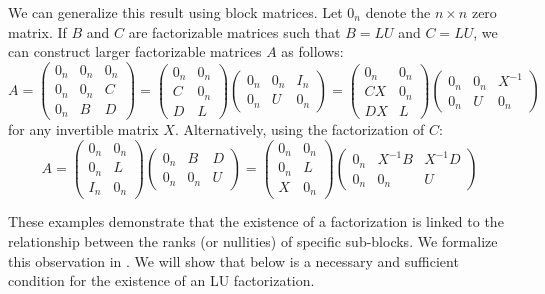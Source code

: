 \documentclass{article}
\begin{document}
We can generalize this result using block matrices. Let $0_n$ denote the $n \times n$ zero matrix. If $B$ and $C$ are factorizable matrices such that $B=LU$ and $C=LU$, we can construct larger factorizable matrices $A$ as follows:
\[
    A = \begin{pmatrix}
        0_n & 0_n & 0_n \\
        0_n & 0_n & C   \\
        0_n & B   & D
    \end{pmatrix}
    =
    \begin{pmatrix}
        0_n & 0_n \\
        C   & 0_n \\
        D   & L
    \end{pmatrix}
    \begin{pmatrix}
        0_n & 0_n & I_n \\
        0_n & U   & 0_n
    \end{pmatrix}
    =
    \begin{pmatrix}
        0_n & 0_n \\
        CX  & 0_n \\
        DX  & L
    \end{pmatrix}
    \begin{pmatrix}
        0_n & 0_n & X^{-1} \\
        0_n & U   & 0_n
    \end{pmatrix}
\]
for any invertible matrix $X$. Alternatively, using the factorization of $C$:
\[
    A =
    \begin{pmatrix}
        0_n & 0_n \\
        0_n & L   \\
        I_n & 0_n
    \end{pmatrix}
    \begin{pmatrix}
        0_n & B   & D \\
        0_n & 0_n & U
    \end{pmatrix}
    =
    \begin{pmatrix}
        0_n & 0_n \\
        0_n & L   \\
        X   & 0_n
    \end{pmatrix}
    \begin{pmatrix}
        0_n & X^{-1} B & X^{-1} D \\
        0_n & 0_n      & U
    \end{pmatrix}
\]

These examples demonstrate that the existence of a factorization is linked to the relationship between the ranks (or nullities) of specific sub-blocks. We formalize this observation in . We will show that  below is a necessary and sufficient condition for the existence of an LU factorization.
\end{document}
